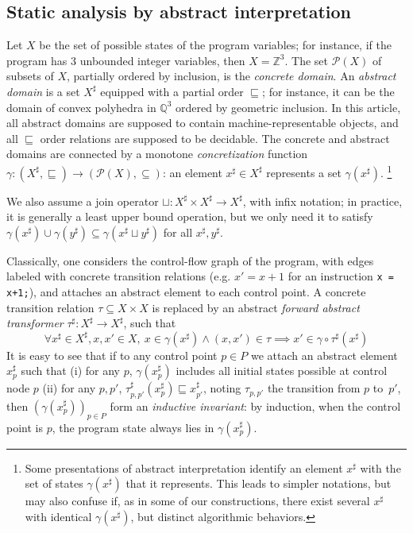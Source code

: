 \documentclass[preprint]{sigplanconf}
\newcommand{\abstr}[1]{#1^\sharp}
\newcommand{\parts}[1]{\mathscr{P}(#1)}
\newcommand{\ZZ}{\mathbb{Z}}
\newcommand{\QQ}{\mathbb{Q}}
\begin{document}
\subsection{Static analysis by abstract interpretation}
\label{sec:static_analysis}
Let $X$ be the set of possible states of the program variables; for instance, if the program has 3 unbounded integer variables, then $X = \ZZ^3$. The set $\parts{X}$ of subsets of $X$, partially ordered by inclusion, is the \emph{concrete domain}. An \emph{abstract domain} is a set $\abstr{X}$ equipped with a partial order $\sqsubseteq$; for instance, it can be the domain of convex polyhedra in $\QQ^3$ ordered by geometric inclusion. In this article, all abstract domains are supposed to contain machine-representable objects, and all $\sqsubseteq$ order relations are supposed to be decidable.
The concrete and abstract domains are connected by a monotone \emph{concretization} function $\gamma: \left(\abstr{X},\sqsubseteq\right) \rightarrow (\parts{X},\subseteq)$: an element $\abstr{x} \in \abstr{X}$ represents a set $\gamma(\abstr{x})$.%
%
\footnote{%
Some presentations of abstract interpretation identify an element $\abstr{x}$ with the set of states $\gamma(\abstr{x})$ that it represents. This leads to simpler notations, but may also confuse if, as in some of our constructions, there exist several $\abstr{x}$ with identical $\gamma(\abstr{x})$, but distinct algorithmic behaviors.}

We also assume a join operator $\sqcup: \abstr{X} \times \abstr{X} \rightarrow \abstr{X}$, with infix notation; in practice, it is generally a least upper bound operation, but we only need it to satisfy $\gamma(\abstr{x}) \cup \gamma(\abstr{y}) \subseteq \gamma(\abstr{x} \sqcup \abstr{y})$ for all $\abstr{x},\abstr{y}$.

Classically, one considers the control-flow graph of the program, with edges labeled with concrete transition relations (e.g. $x' = x+1$ for an instruction \lstinline|x = x+1;|), and attaches an abstract element to each control point.
A concrete transition relation $\tau \subseteq X \times X$ is replaced by an abstract \emph{forward abstract transformer} $\abstr{\tau}: \abstr{X} \rightarrow \abstr{X}$, such that
\begin{equation}
\forall \abstr{x} \in \abstr{X}, x,x' \in X,~
x \in \gamma(\abstr{x}) \land (x,x') \in \tau \implies
x' \in \gamma \circ \abstr{\tau}(\abstr{x})
\label{eqn:transformer_correct}
\end{equation}
It is easy to see that if to any control point $p \in P$ we attach an abstract element $\abstr{x}_p$ such that
(i) for any $p$, $\gamma(\abstr{x}_p)$ includes all initial states possible at control node $p$
(ii) for any $p,p'$, $\abstr{\tau}_{p,p'} (\abstr{x}_p) \sqsubseteq \abstr{x}_{p'}$, noting $\tau_{p,p'}$ the transition from $p$ to~$p'$, then $(\gamma(\abstr{x}_p))_{p \in P}$ form an \emph{inductive invariant}: by induction, when the control point is $p$, the program state always lies in $\gamma(\abstr{x}_p)$.
\end{document}
